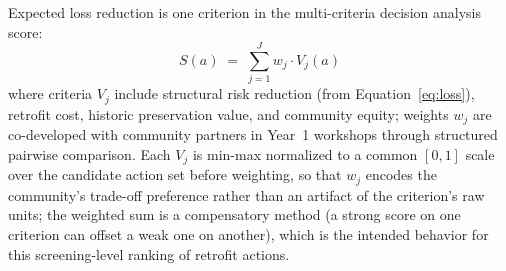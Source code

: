 \documentclass[11pt]{article}
\begin{document}
Expected loss reduction is one criterion in the multi-criteria decision analysis
score:
\begin{equation}\label{eq:mcda}
  S(a) \;=\; \sum_{j=1}^{J} w_j \cdot V_j(a)
\end{equation}
where criteria $V_j$ include structural risk reduction (from Equation~\eqref{eq:loss}), retrofit
cost, historic preservation value, and community equity; weights $w_j$ are
co-developed with community partners in Year~1 workshops through structured pairwise
comparison.
Each $V_j$ is min-max normalized to a common $[0,1]$ scale over the candidate
action set before weighting, so that $w_j$ encodes the community's trade-off
preference rather than an artifact of the criterion's raw units; the weighted sum
is a compensatory method (a strong score on one criterion can offset a weak one
on another), which is the intended behavior for this screening-level ranking of
retrofit actions.
\end{document}
